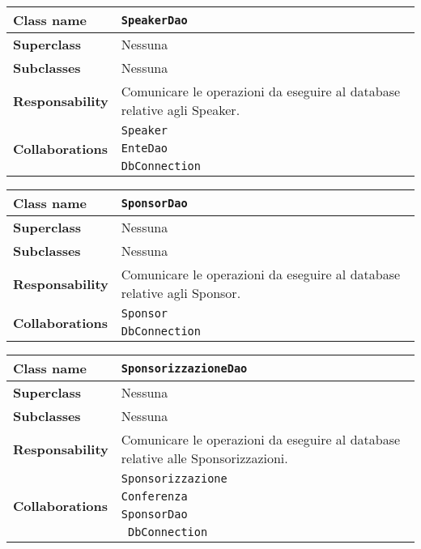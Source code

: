\begin{table}[h!]
	\begin{tabular}{|l|l|}
		\hline 
		\textbf{Class name} & \texttt{SpeakerDao}
		\\ \hline
		\textbf{Superclass} & Nessuna
		\\ \hline
		\multirow{1}{*}{\textbf{Subclasses}} & Nessuna
		\\ \hline
		\textbf{Responsability} & Comunicare le operazioni da eseguire al database relative agli Speaker.
		\\ \hline
		\multirow{3}{*}{\textbf{Collaborations}} & \texttt{Speaker} \\ 
		& \texttt{EnteDao} \\
		& \texttt{DbConnection} \\ \hline
	\end{tabular}
\end{table}

\begin{table}[h!]
	\begin{tabular}{|l|l|}
		\hline 
		\textbf{Class name} & \texttt{SponsorDao}
		\\ \hline
		\textbf{Superclass} & Nessuna
		\\ \hline
		\multirow{1}{*}{\textbf{Subclasses}} & Nessuna
		\\ \hline
		\textbf{Responsability} & Comunicare le operazioni da eseguire al database relative agli Sponsor.
		\\ \hline
		\multirow{2}{*}{\textbf{Collaborations}} & \texttt{Sponsor} \\ 
		& \texttt{DbConnection} \\ \hline
	\end{tabular}
\end{table}

\begin{table}[h!]
	\begin{tabular}{|l|l|}
		\hline 
		\textbf{Class name} & \texttt{SponsorizzazioneDao}
		\\ \hline
		\textbf{Superclass} & Nessuna
		\\ \hline
		\multirow{1}{*}{\textbf{Subclasses}} & Nessuna
		\\ \hline
		\textbf{Responsability} & Comunicare le operazioni da eseguire al database relative alle Sponsorizzazioni.
		\\ \hline
		\multirow{4}{*}{\textbf{Collaborations}} & \texttt{Sponsorizzazione} \\ 
		& \texttt{Conferenza} \\
		& \texttt{SponsorDao} \\
		&\texttt{ DbConnection} \\ \hline
	\end{tabular}
\end{table}

